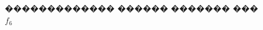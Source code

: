 \documentclass[a4paper]{article}
\begin{document}
\begin{figure}[h]
\begin{minipage}[h]{0.49\linewidth}
  \end{minipage}
  \caption{������������� ������ ������� ��� $f_6$}
  \label{ris:image1}
\end{figure}

\begin{figure}[h]
  \begin{minipage}[h]{0.49\linewidth}
  \end{minipage}
  \hfill
  \begin{minipage}[h]{0.49\linewidth}

\end{minipage}
\end{figure}
\end{document}
